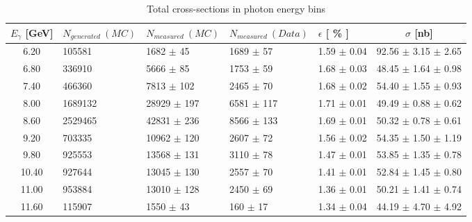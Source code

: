 \documentclass[8pt]{extarticle}
\begin{document}
 \begin{table}[!htbp]
 \begin{minipage}{\textwidth}
 \begin{center}
 \caption{Total cross-sections in photon energy bins}
 \begin{tabularx}{\textwidth}{|c|X|X|X|X|c|}
 \hline
 $E_{\gamma}$ [GeV] & $N_{generated}~(MC)$ & $N_{measured}~(MC)$ & $N_{measured}~(Data)$ & $\epsilon$ [ \% ] & $\sigma$ [nb] \\ 
 \hline
6.20 & 105581 & 1682 $\pm$ 45 & 1689 $\pm$ 57 & 1.59 $\pm$ 0.04 & 92.56 $\pm$ 3.15 $\pm$ 2.65 \\ 
6.80 & 336910 & 5666 $\pm$ 85 & 1753 $\pm$ 59 & 1.68 $\pm$ 0.03 & 48.45 $\pm$ 1.64 $\pm$ 0.98 \\ 
7.40 & 466360 & 7813 $\pm$ 102 & 2465 $\pm$ 70 & 1.68 $\pm$ 0.02 & 54.40 $\pm$ 1.55 $\pm$ 0.93 \\ 
8.00 & 1689132 & 28929 $\pm$ 197 & 6581 $\pm$ 117 & 1.71 $\pm$ 0.01 & 49.49 $\pm$ 0.88 $\pm$ 0.62 \\ 
8.60 & 2529465 & 42831 $\pm$ 236 & 8566 $\pm$ 133 & 1.69 $\pm$ 0.01 & 50.32 $\pm$ 0.78 $\pm$ 0.61 \\ 
9.20 & 703335 & 10962 $\pm$ 120 & 2607 $\pm$ 72 & 1.56 $\pm$ 0.02 & 54.35 $\pm$ 1.50 $\pm$ 1.19 \\ 
9.80 & 925553 & 13568 $\pm$ 131 & 3110 $\pm$ 78 & 1.47 $\pm$ 0.01 & 53.85 $\pm$ 1.35 $\pm$ 0.78 \\ 
10.40 & 927644 & 13045 $\pm$ 130 & 2557 $\pm$ 70 & 1.41 $\pm$ 0.01 & 52.84 $\pm$ 1.45 $\pm$ 0.80 \\ 
11.00 & 953884 & 13010 $\pm$ 128 & 2450 $\pm$ 69 & 1.36 $\pm$ 0.01 & 50.21 $\pm$ 1.41 $\pm$ 0.74 \\ 
11.60 & 115907 & 1550 $\pm$ 43 & 160 $\pm$ 17 & 1.34 $\pm$ 0.04 & 44.19 $\pm$ 4.70 $\pm$ 4.92 \\ 
\hline
 \end{tabularx}
 \end{center}
 \end{minipage}
 \end{table}
 
\end{document}

